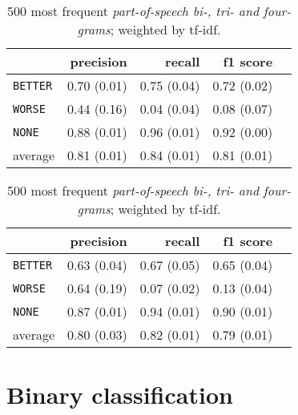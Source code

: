 \begin{table}[!htb]
    \begin{minipage}{.5\linewidth}
   \caption{ \emph{Mean Word Embeddings} for the middle part of the sentence. } 

\begin{tabular}{@{}lrrrr@{}}
\toprule
 	&	 precision &	 recall &	 f1 score  \\ \midrule 
\texttt{BETTER}	&	 0.70 \scriptsize{(0.01)} &	 0.75 \scriptsize{(0.04)} &	 0.72 \scriptsize{(0.02)}  \\ 
\texttt{WORSE}	&	 0.44 \scriptsize{(0.16)} &	 0.04 \scriptsize{(0.04)} &	 0.08 \scriptsize{(0.07)}  \\ 
\texttt{NONE}	&	 0.88 \scriptsize{(0.01)} &	 0.96 \scriptsize{(0.01)} &	 0.92 \scriptsize{(0.00)}  \\ 
average	&	 0.81 \scriptsize{(0.01)} &	 0.84 \scriptsize{(0.01)} &	 0.81 \scriptsize{(0.01)}  \\ 
\bottomrule
\end{tabular}
  \end{minipage} \hfill
    \begin{minipage}{.5\linewidth}
     \caption{500 most frequent \emph{part-of-speech bi-, tri- and four-grams}; weighted by tf-idf.} 
\begin{tabular}{@{}lrrrr@{}}
\toprule
 	&	 precision &	 recall &	 f1 score  \\ \midrule 
\texttt{BETTER}	&	 0.63 \scriptsize{(0.04)} &	 0.67 \scriptsize{(0.05)} &	 0.65 \scriptsize{(0.04)}  \\ 
\texttt{WORSE}	&	 0.64 \scriptsize{(0.19)} &	 0.07 \scriptsize{(0.02)} &	 0.13 \scriptsize{(0.04)}  \\ 
\texttt{NONE}	&	 0.87 \scriptsize{(0.01)} &	 0.94 \scriptsize{(0.01)} &	 0.90 \scriptsize{(0.01)}  \\ 
average	&	 0.80 \scriptsize{(0.03)} &	 0.82 \scriptsize{(0.01)} &	 0.79 \scriptsize{(0.01)}  \\ 
\bottomrule
\end{tabular}
    \end{minipage} 
\end{table}








\section{Binary classification}
